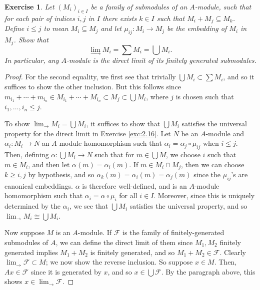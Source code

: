 \documentclass[12pt,letterpaper]{article}
\newtheorem{problem}{Exercise}[section]
\theoremstyle{definition}
\theoremstyle{remark}
\numberwithin{figure}{problem}
\numberwithin{equation}{section}
\begin{document}
\begin{problem}
  Let $(M_i)_{i \in I}$ be a family of submodules of an $A$-module, such that for each pair of indices $i,j$ in $I$ there exists $k \in I$ such that $M_i + M_j \subseteq M_k$. Define $i \le j$ to mean $M_i \subseteq M_j$ and let $\mu_{ij} \colon M_i \to M_j$ be the embedding of $M_i$ in $M_j$. Show that
  \begin{equation*}
    \lim_{\longrightarrow} M_i = \sum M_i = \bigcup M_i.
  \end{equation*}
  In particular, any $A$-module is the direct limit of its finitely generated submodules.
\end{problem}
\begin{proof}
  For the second equality, we first see that trivially $\bigcup M_i \subset
  \sum M_i$, and so it suffices to show the other inclusion.
  But this follows since
  $m_{i_1} + \cdots + m_{i_n} \in M_{i_1} + \cdots + M_{i_n} \subset
  M_j \subset \bigcup M_i$, where $j$ is chosen such that $i_1,\ldots,i_n \le
  j$.

  \par To show $\displaystyle\lim_{\longrightarrow} M_i = \bigcup M_i$, it
  suffices to show that $\bigcup M_i$ satisfies the universal property for the
  direct limit in Exercise \ref{exc:2.16}.
  Let $N$ be an $A$-module and $\alpha_i\colon M_i \to N$ an $A$-module
  homomorphism such that $\alpha_i = \alpha_j \circ \mu_{ij}$ when $i \le j$.
  Then, defining $\alpha\colon \bigcup M_i \to N$ such that for $m \in \bigcup
  M$, we choose $i$ such that $m \in M_i$, and then let $\alpha(m) =
  \alpha_i(m)$.
  If $m \in M_i \cap M_j$, then we can choose $k \ge i,j$
  by hypothesis, and so $\alpha_k(m) = \alpha_i(m) = \alpha_j(m)$ since the
  $\mu_{ij}$'s are canonical embeddings.
  $\alpha$ is therefore well-defined, and is an $A$-module homomorphism such
  that $\alpha_i = \alpha \circ \mu_i$ for all $i \in I$.
  Moreover, since this is uniquely determined by the $\alpha_i$, we see that
  $\bigcup M_i$ satisfies the universal property, and so
  $\displaystyle\lim_{\longrightarrow} M_i \cong \bigcup M_i$.
  
  \par Now suppose $M$ is an $A$-module.
  If $\mathscr{F}$ is the family of finitely-generated submodules of $A$,
  we can define the direct limit of them since $M_1,M_2$ finitely generated
  implies $M_1 + M_2$ is finitely generated, and so $M_1 + M_2 \in \mathscr{F}$.
  Clearly $\displaystyle\lim_{\longrightarrow} \mathscr{F} \subset M$; we
  now show the reverse inclusion.
  So suppose $x \in M$.
  Then, $Ax \in \mathscr{F}$ since it is generated by $x$, and so
  $x \in \bigcup \mathscr{F}$.
  By the paragraph above, this shows
  $x \in \displaystyle\lim_{\longrightarrow} \mathscr{F}$.
\end{proof}
\end{document}
